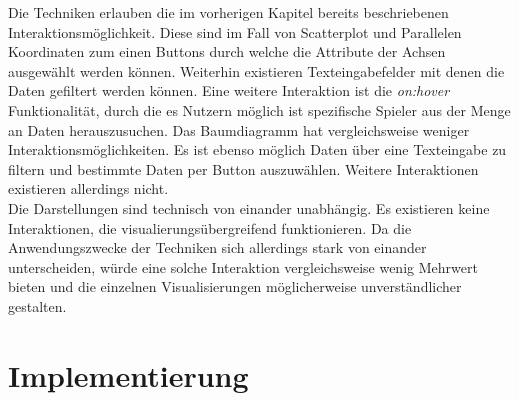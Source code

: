 \documentclass[usegeometry=true]{scrartcl}
\begin{document}
Die Techniken erlauben die im vorherigen Kapitel bereits beschriebenen Interaktionsmöglichkeit. Diese sind im Fall von Scatterplot und Parallelen Koordinaten zum einen Buttons durch welche die Attribute der Achsen ausgewählt werden können.
Weiterhin existieren  Texteingabefelder mit denen die Daten gefiltert werden können. Eine weitere Interaktion ist die \textit{on:hover} Funktionalität, durch die es Nutzern möglich ist spezifische Spieler aus der Menge an Daten herauszusuchen. 
Das Baumdiagramm hat vergleichsweise weniger Interaktionsmöglichkeiten. Es ist ebenso möglich Daten über eine Texteingabe zu filtern und bestimmte Daten per Button auszuwählen. Weitere Interaktionen existieren allerdings nicht.\\
Die Darstellungen sind technisch von einander unabhängig. Es existieren keine Interaktionen, die visualierungsübergreifend funktionieren. Da die Anwendungszwecke der Techniken sich allerdings stark von einander unterscheiden, würde eine solche Interaktion vergleichsweise wenig Mehrwert bieten und die einzelnen Visualisierungen möglicherweise unverständlicher gestalten. 

\section{Implementierung}
\end{document}
